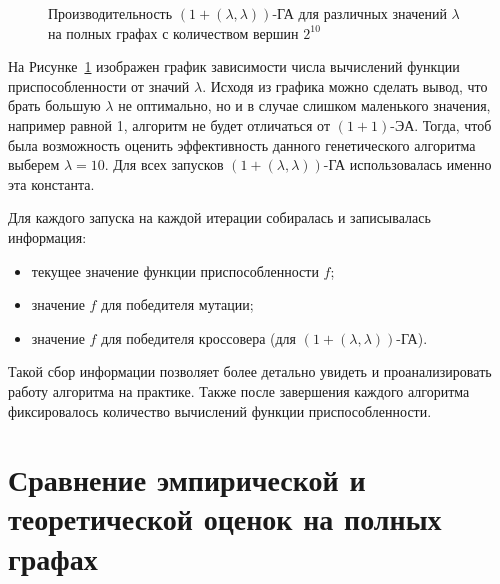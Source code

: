 \documentclass[times]{itmo-student-thesis}
\newcommand{\alglambdaf}{${(1 + (\lambda , \lambda))}$-ГА\xspace}
\newcommand{\oea}{\mbox{$(1 + 1)$-ЭА}\xspace}
\newcommand{\ollga}{${(1 + (\lambda , \lambda))}$-ГА\xspace}
\begin{document}
\begin{figure}[t!]
\caption{Производительность \ollga для различных значений $\lambda$ на полных графах с количеством вершин $2^{10}$}
\label{fig:lambda}
\end{figure}

На Рисунке~\ref{fig:lambda} изображен график зависимости числа вычислений функции приспособленности от значий $\lambda$. Исходя из графика можно сделать вывод, что брать большую $\lambda$ не оптимально, но и в случае слишком маленького значения, например равной 1, алгоритм не будет отличаться от \oea. Тогда, чтоб была возможность оценить эффективность данного генетического алгоритма выберем $\lambda = 10$. Для всех запусков \alglambdaf использовалась именно эта константа.

Для каждого запуска на каждой итерации собиралась и записывалась  информация:
\begin{itemize}
 \item текущее значение функции приспособленности $f$;
 \item значение $f$ для победителя мутации;
 \item значение $f$ для победителя кроссовера (для \alglambdaf).
\end{itemize}

Такой сбор информации позволяет более детально увидеть и проанализировать работу алгоритма на практике.
Также после завершения каждого алгоритма фиксировалось количество вычислений функции приспособленности.

\section{Сравнение эмпирической и теоретической оценок на полных графах}
\end{document}
